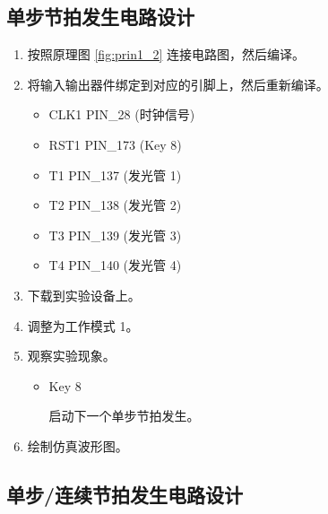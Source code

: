 \subsection{单步节拍发生电路设计}

\begin{enumerate}
    \item 按照原理图 \ref{fig:prin1_2} 连接电路图，然后编译。
    \item 将输入输出器件绑定到对应的引脚上，然后重新编译。
    
    \begin{itemize}
        \item CLK1 PIN\_28 (时钟信号)
        \item RST1 PIN\_173 (Key 8)
        \item T1 PIN\_137 (发光管 1)
        \item T2 PIN\_138 (发光管 2)
        \item T3 PIN\_139 (发光管 3)
        \item T4 PIN\_140 (发光管 4)
    \end{itemize}
    
    \item 下载到实验设备上。
    \item 调整为工作模式 1。
    \item 观察实验现象。
    
    \begin{itemize}
        \item Key 8
        
        启动下一个单步节拍发生。
        
    \end{itemize}
    \item 绘制仿真波形图。
\end{enumerate}

\subsection{单步/连续节拍发生电路设计}


